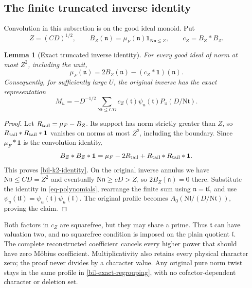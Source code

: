 \documentclass[11pt]{article}
\newtheorem{lemma}[theorem]{Lemma}
\theoremstyle{definition}
\newcommand{\N}{\mathrm N}
\newcommand{\Id}{\mathbf 1}
\begin{document}
\subsection{The finite truncated inverse identity}

Convolution in this subsection is on the good ideal monoid.  Put
\begin{equation}\label{bil-truncated-coefficient}
 Z=(CD)^{1/2},\qquad
 B_Z(\mathfrak n)=\mu_F(\mathfrak n)
                     \Id_{\N\mathfrak n\le Z},
 \qquad c_Z=B_Z*B_Z.
\end{equation}

\begin{lemma}[Exact truncated inverse identity]
\label{bil-truncated-identity}
For every good ideal of norm at most $Z^2$, including the unit,
\begin{equation}\label{bil-k2-identity}
 \mu_F(\mathfrak n)=2B_Z(\mathfrak n)
                       -(c_Z*\mathbf1)(\mathfrak n).
\end{equation}
Consequently, for sufficiently large $U$, the original inverse has the
exact representation
\begin{equation}\label{bil-exact-regrouping}
 M_u=-D^{-1/2}\sum_{\N\mathfrak t\le CD}
    c_Z(\mathfrak t)\psi_u(\mathfrak t)
                          P_u(D/\N\mathfrak t).
\end{equation}
\end{lemma}
\begin{proof}
Let $R_{\rm tail}=\mu_F-B_Z$.  Its support has norm strictly greater than $Z$,
so $R_{\rm tail}*R_{\rm tail}*\mathbf1$ vanishes on norms at most $Z^2$, including the
boundary.  Since $\mu_F*\mathbf1$ is the convolution identity,
\[
 B_Z*B_Z*\mathbf1=\mu_F-2R_{\rm tail}+R_{\rm tail}*R_{\rm tail}*\mathbf1.
\]
This proves \eqref{bil-k2-identity}.  On the original inverse annulus
we have $\N\mathfrak n\le CD=Z^2$ and eventually
$\N\mathfrak n\ge cD>Z$, so $2B_Z(\mathfrak n)=0$ there.
Substitute the identity in \eqref{eq-polynomials}, rearrange the finite
sum using $\mathfrak n=\mathfrak t\mathfrak l$, and use
$\psi_u(\mathfrak t\mathfrak l)
=\psi_u(\mathfrak t)\psi_u(\mathfrak l)$.
The original profile becomes
$A_0(\N\mathfrak l/(D/\N\mathfrak t))$, proving the claim.
\end{proof}

Both factors in $c_Z$ are squarefree, but they may share a prime.
Thus $\mathfrak t$ can have valuation two, and no squarefree condition
is imposed on the plain quotient $\mathfrak l$.
The complete reconstructed coefficient cancels every higher power that
should have zero M\"obius coefficient.  Multiplicativity also retains
every physical character zero; the proof never divides by a character
value.  Any original pure norm twist stays in the same profile in
\eqref{bil-exact-regrouping}, with no cofactor-dependent character or
deletion set.
\end{document}
